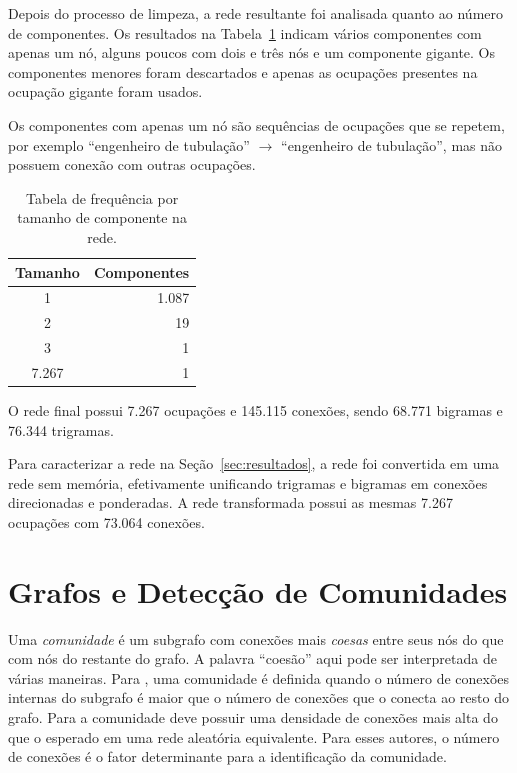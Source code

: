 \documentclass[
  article,
  11pt,
  a4paper,
  english,
  brazil,
  sumario=tradicional]{abntex2}
\begin{document}
Depois do processo de limpeza, a rede resultante foi analisada quanto ao número de componentes. Os resultados na Tabela~\ref{tab:componentes} indicam vários componentes com apenas um nó, alguns poucos com dois e três nós e um componente gigante. Os componentes menores foram descartados e apenas as ocupações presentes na ocupação gigante foram usados.

Os componentes com apenas um nó são sequências de ocupações que se repetem, por exemplo \enquote{engenheiro de tubulação} $\to$ \enquote{engenheiro de tubulação}, mas não possuem conexão com outras ocupações.

\begin{table}
    \centering
    \begin{tabular}{@{} c r @{}}
        \toprule
        Tamanho & Componentes \\
        \midrule
        1        &  1.087 \\
        2        &  19 \\
        3        &  1 \\
        7.267 &  1 \\
        \bottomrule
    \end{tabular}
    \caption{Tabela de frequência por tamanho de componente na rede.}
    \label{tab:componentes}
\end{table}

O rede final possui 7.267 ocupações e 145.115 conexões, sendo 68.771 bigramas e 76.344 trigramas.

Para caracterizar a rede na Seção~\ref{sec:resultados}, a rede foi convertida em uma rede sem memória, efetivamente unificando trigramas e bigramas em conexões direcionadas e ponderadas. A rede transformada possui as mesmas 7.267 ocupações com 73.064 conexões.

\section{Grafos e Detecção de Comunidades} \label{sec:comunidades}

Uma \textit{comunidade} é um subgrafo com conexões mais \textit{coesas} entre seus nós do que com nós do restante do grafo. A palavra \enquote{coesão} aqui pode ser interpretada de várias maneiras. Para , uma comunidade é definida quando o número de conexões internas do subgrafo é maior que o número de conexões que o conecta ao resto do grafo. Para  a comunidade deve possuir uma densidade de conexões mais alta do que o esperado em uma rede aleatória equivalente. Para esses autores, o número de conexões é o fator determinante para a identificação da comunidade.
\end{document}
